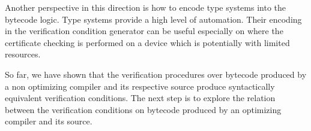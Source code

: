 
Another perspective in this direction is how   to encode
 type systems into the bytecode logic. 
Type systems provide a high level of automation. 
Their encoding in the verification condition generator can be useful
especially on where the certificate checking is performed on a 
 device which is potentially with limited resources.

 So far, we have shown that the verification procedures over bytecode produced by
a non optimizing compiler  and its respective source produce syntactically 
equivalent verification conditions. The next step is to explore 
the relation between  the verification conditions on bytecode produced by an optimizing compiler and its source.  

